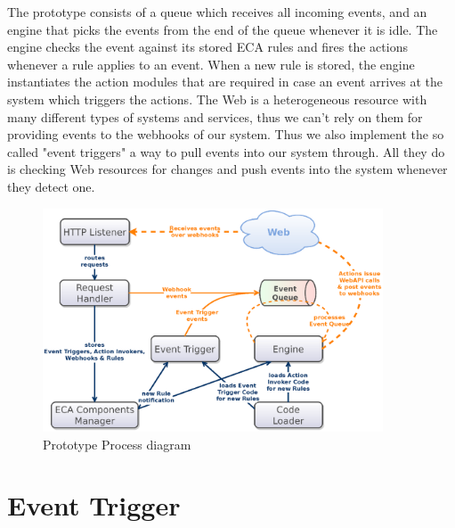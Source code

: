 The prototype consists of a queue which receives all incoming events, and an engine that picks the events from the end of the queue whenever it is idle.
The engine checks the event against its stored ECA rules and fires the actions whenever a rule applies to an event.
When a new rule is stored, the engine instantiates the action modules that are required in case an event arrives at the system which triggers the actions.
The Web is a heterogeneous resource with many different types of systems and services, thus we can't rely on them for providing events to the webhooks of our system.
Thus we also implement the so called "event triggers" a way to pull events into our system through.
All they do is checking Web resources for changes and push events into the system whenever they detect one.
\begin{figure}[!ht]
	\centering
  \includegraphics[width=0.9\textwidth]{figures/Architecture_wET}
	\caption{Prototype Process diagram}
	\label{fig:Architecture_wET}
\end{figure}


\section{Event Trigger}





